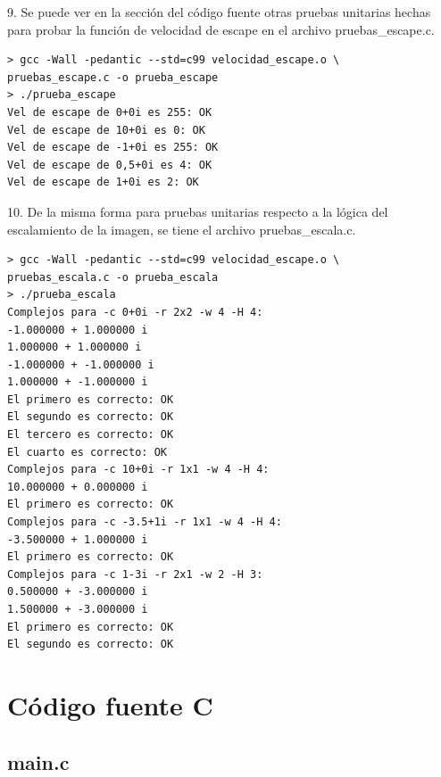 \documentclass[a4paper,10pt]{article}
\begin{document}
9. Se puede ver en la sección del código fuente otras pruebas unitarias hechas para probar la función de velocidad de escape en el archivo pruebas\_escape.c.
\begin{verbatim}
> gcc -Wall -pedantic --std=c99 velocidad_escape.o \
pruebas_escape.c -o prueba_escape
> ./prueba_escape
Vel de escape de 0+0i es 255: OK
Vel de escape de 10+0i es 0: OK
Vel de escape de -1+0i es 255: OK
Vel de escape de 0,5+0i es 4: OK
Vel de escape de 1+0i es 2: OK
\end{verbatim}

10. De la misma forma para pruebas unitarias respecto a la lógica del escalamiento de la imagen, se tiene el archivo pruebas\_escala.c.
\begin{verbatim}
> gcc -Wall -pedantic --std=c99 velocidad_escape.o \
pruebas_escala.c -o prueba_escala
> ./prueba_escala
Complejos para -c 0+0i -r 2x2 -w 4 -H 4:
-1.000000 + 1.000000 i
1.000000 + 1.000000 i
-1.000000 + -1.000000 i
1.000000 + -1.000000 i
El primero es correcto: OK
El segundo es correcto: OK
El tercero es correcto: OK
El cuarto es correcto: OK
Complejos para -c 10+0i -r 1x1 -w 4 -H 4:
10.000000 + 0.000000 i
El primero es correcto: OK
Complejos para -c -3.5+1i -r 1x1 -w 4 -H 4:
-3.500000 + 1.000000 i
El primero es correcto: OK
Complejos para -c 1-3i -r 2x1 -w 2 -H 3:
0.500000 + -3.000000 i
1.500000 + -3.000000 i
El primero es correcto: OK
El segundo es correcto: OK
\end{verbatim}



\section{C\'odigo fuente C}

\subsection{main.c}
\end{document}
